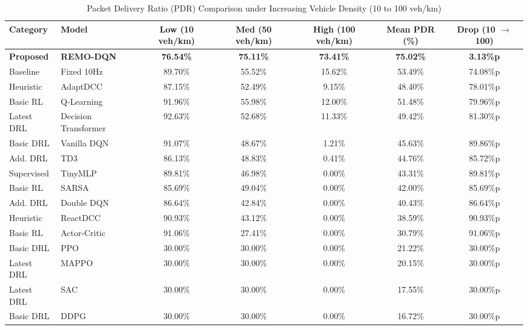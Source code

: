 \documentclass[journal]{IEEEtran}
\begin{document}
\begin{table}[t]
\caption{Packet Delivery Ratio (PDR) Comparison under Increasing Vehicle Density (10 to 100 veh/km)}
\label{tab:pdr_density_stats}
\centering
\scriptsize
\begin{tabularx}{\textwidth}{l l c c c c c}
\toprule
\textbf{Category} & \textbf{Model} & \textbf{Low (10 veh/km)} & \textbf{Med (50 veh/km)} & \textbf{High (100 veh/km)} & \textbf{Mean PDR (\%)} & \textbf{Drop (10 $\to$ 100)} \\
\midrule
\textbf{Proposed} & \textbf{REMO-DQN} & \textbf{76.54\%} & \textbf{75.11\%} & \textbf{73.41\%} & \textbf{75.02\%} & \textbf{3.13\%p} \\
Baseline & Fixed 10Hz & 89.70\% & 55.52\% & 15.62\% & 53.49\% & 74.08\%p \\
Heuristic & AdaptDCC & 87.15\% & 52.49\% & 9.15\% & 48.40\% & 78.01\%p \\
Basic RL & Q-Learning & 91.96\% & 55.98\% & 12.00\% & 51.48\% & 79.96\%p \\
Latest DRL & Decision Transformer & 92.63\% & 52.68\% & 11.33\% & 49.42\% & 81.30\%p \\
Basic DRL & Vanilla DQN & 91.07\% & 48.67\% & 1.21\% & 45.63\% & 89.86\%p \\
Add. DRL & TD3 & 86.13\% & 48.83\% & 0.41\% & 44.76\% & 85.72\%p \\
Supervised & TinyMLP & 89.81\% & 46.98\% & 0.00\% & 43.31\% & 89.81\%p \\
Basic RL & SARSA & 85.69\% & 49.04\% & 0.00\% & 42.00\% & 85.69\%p \\
Add. DRL & Double DQN & 86.64\% & 42.84\% & 0.00\% & 40.43\% & 86.64\%p \\
Heuristic & ReactDCC & 90.93\% & 43.12\% & 0.00\% & 38.59\% & 90.93\%p \\
Basic RL & Actor-Critic & 91.06\% & 27.41\% & 0.00\% & 30.79\% & 91.06\%p \\
Basic DRL & PPO & 30.00\% & 30.00\% & 0.00\% & 21.22\% & 30.00\%p \\
Latest DRL & MAPPO & 30.00\% & 30.00\% & 0.00\% & 20.15\% & 30.00\%p \\
Latest DRL & SAC & 30.00\% & 30.00\% & 0.00\% & 17.55\% & 30.00\%p \\
Basic DRL & DDPG & 30.00\% & 30.00\% & 0.00\% & 16.72\% & 30.00\%p \\
\bottomrule
\end{tabularx}
\end{table}
\end{document}

